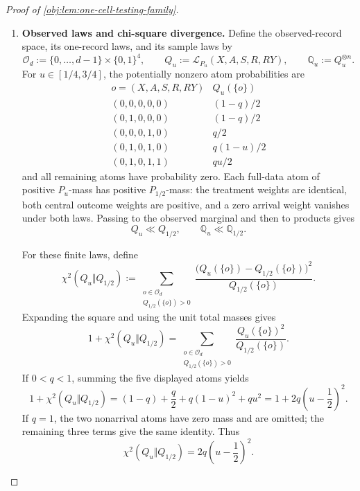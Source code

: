 \begin{proof}[Proof of \cref{obj:lem:one-cell-testing-family}]
\begin{enumerate}
\item \textbf{Observed laws and chi-square divergence.}
Define the observed-record space, its one-record laws, and its sample laws by
\[
\mathcal O_d:=\{0,\ldots,d-1\}\times\{0,1\}^4,
\qquad
Q_u:=\mathcal L_{P_u}(X,A,S,R,RY),
\qquad
\mathbb Q_u:=Q_u^{\otimes n}.
\]
For \(u\in[1/4,3/4]\), the potentially nonzero atom probabilities are
\[
\begin{array}{c|c}
o=(X,A,S,R,RY)&Q_u(\{o\})\\ \hline
(0,0,0,0,0)&(1-q)/2\\
(0,1,0,0,0)&(1-q)/2\\
(0,0,0,1,0)&q/2\\
(0,1,0,1,0)&q(1-u)/2\\
(0,1,0,1,1)&qu/2
\end{array}
\]
and all remaining atoms have probability zero. Each full-data atom of positive \(P_u\)-mass has positive \(P_{1/2}\)-mass: the treatment weights are identical, both central outcome weights are positive, and a zero arrival weight vanishes under both laws. Passing to the observed marginal and then to products gives
\[
Q_u\ll Q_{1/2},
\qquad
\mathbb Q_u\ll\mathbb Q_{1/2}.
\]

For these finite laws, define
\[
\chi^2(Q_u\Vert Q_{1/2})
:=
\sum_{\substack{o\in\mathcal O_d\\Q_{1/2}(\{o\})>0}}
\frac{\bigl(Q_u(\{o\})-Q_{1/2}(\{o\})\bigr)^2}
     {Q_{1/2}(\{o\})}.
\]
Expanding the square and using the unit total masses gives
\[
1+\chi^2(Q_u\Vert Q_{1/2})
=
\sum_{\substack{o\in\mathcal O_d\\Q_{1/2}(\{o\})>0}}
\frac{Q_u(\{o\})^2}{Q_{1/2}(\{o\})}.
\]
If \(0<q<1\), summing the five displayed atoms yields
\[
1+\chi^2(Q_u\Vert Q_{1/2})
=
(1-q)+\frac q2+q(1-u)^2+qu^2
=
1+2q\left(u-\frac12\right)^2.
\]
If \(q=1\), the two nonarrival atoms have zero mass and are omitted; the remaining three terms give the same identity. Thus
\[
\chi^2(Q_u\Vert Q_{1/2})
=
2q\left(u-\frac12\right)^2.
\]


\end{enumerate}
\end{proof}
